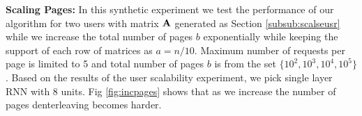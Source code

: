 	
	{\bf Scaling Pages:}
	In this synthetic experiment we test the performance of our algorithm for two users with matrix $\mathbf{A}$ generated as Section \ref{subsub:scalseusr} while we increase the total number of pages $b$ exponentially while keeping the support of each row of matrices as $a = n / 10$.
	Maximum number of requests per page is limited to 5 and total number of pages $b$ is from the set $\{ 10^2, 10^3, 10^4, 10^5 \}$.
	Based on the results of the user scalability experiment, we pick single layer RNN with 8 units. 
	Fig \ref{fig:incpages} shows that as we increase the number of pages denterleaving becomes harder. 
%	
